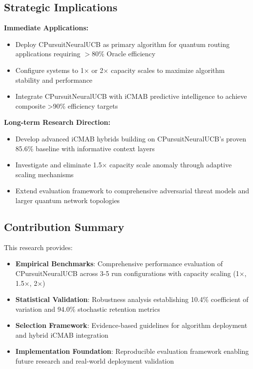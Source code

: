 \documentclass[12pt,a4paper]{article}
\newcommand{\primarytext}[1]{\textcolor{primaryblue}{\textbf{#1}}}
\newcommand{\secondarytext}[1]{\textcolor{secondaryblue}{\textbf{#1}}}
\newcommand{\success}[1]{\textcolor{accentgreen}{\textbf{#1}}}
\begin{document}
\subsection{Strategic Implications}

\textbf{Immediate Applications:}
\begin{itemize}
\item Deploy CPursuitNeuralUCB as primary algorithm for quantum routing applications requiring $>$80\% Oracle efficiency
\item Configure systems to 1× or 2× capacity scales to maximize algorithm stability and performance
\item Integrate CPursuitNeuralUCB with iCMAB predictive intelligence to achieve composite >90\% efficiency targets
\end{itemize}

\textbf{Long-term Research Direction:}
\begin{itemize}
\item Develop advanced iCMAB hybrids building on CPursuitNeuralUCB's proven 85.6\% baseline with informative context layers
\item Investigate and eliminate 1.5× capacity scale anomaly through adaptive scaling mechanisms
\item Extend evaluation framework to comprehensive adversarial threat models and larger quantum network topologies
\end{itemize}

\subsection{Contribution Summary}

This research provides:

\begin{itemize}
\item \primarytext{Empirical Benchmarks}: Comprehensive performance evaluation of CPursuitNeuralUCB across 3-5 run configurations with capacity scaling (1×, 1.5×, 2×)
\item \success{Statistical Validation}: Robustness analysis establishing 10.4\% coefficient of variation and 94.0\% stochastic retention metrics
\item \secondarytext{Selection Framework}: Evidence-based guidelines for algorithm deployment and hybrid iCMAB integration
\item \textbf{Implementation Foundation}: Reproducible evaluation framework enabling future research and real-world deployment validation
\end{itemize}
\end{document}
